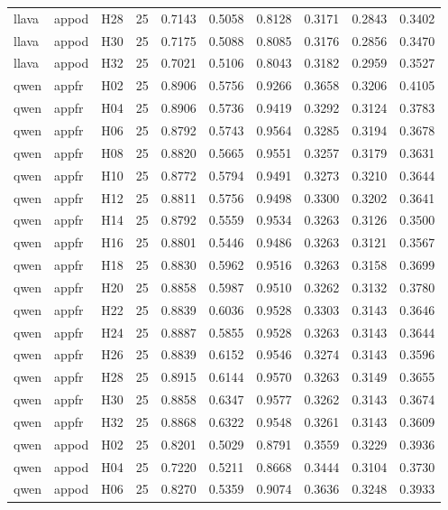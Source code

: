 \begin{table}[tbp]
\begin{tabular}{lllrrrrrrr}
llava & appod & H28 & 25 & 0.7143 & 0.5058 & 0.8128 & 0.3171 & 0.2843 & 0.3402 \\
llava & appod & H30 & 25 & 0.7175 & 0.5088 & 0.8085 & 0.3176 & 0.2856 & 0.3470 \\
llava & appod & H32 & 25 & 0.7021 & 0.5106 & 0.8043 & 0.3182 & 0.2959 & 0.3527 \\
qwen & appfr & H02 & 25 & 0.8906 & 0.5756 & 0.9266 & 0.3658 & 0.3206 & 0.4105 \\
qwen & appfr & H04 & 25 & 0.8906 & 0.5736 & 0.9419 & 0.3292 & 0.3124 & 0.3783 \\
qwen & appfr & H06 & 25 & 0.8792 & 0.5743 & 0.9564 & 0.3285 & 0.3194 & 0.3678 \\
qwen & appfr & H08 & 25 & 0.8820 & 0.5665 & 0.9551 & 0.3257 & 0.3179 & 0.3631 \\
qwen & appfr & H10 & 25 & 0.8772 & 0.5794 & 0.9491 & 0.3273 & 0.3210 & 0.3644 \\
qwen & appfr & H12 & 25 & 0.8811 & 0.5756 & 0.9498 & 0.3300 & 0.3202 & 0.3641 \\
qwen & appfr & H14 & 25 & 0.8792 & 0.5559 & 0.9534 & 0.3263 & 0.3126 & 0.3500 \\
qwen & appfr & H16 & 25 & 0.8801 & 0.5446 & 0.9486 & 0.3263 & 0.3121 & 0.3567 \\
qwen & appfr & H18 & 25 & 0.8830 & 0.5962 & 0.9516 & 0.3263 & 0.3158 & 0.3699 \\
qwen & appfr & H20 & 25 & 0.8858 & 0.5987 & 0.9510 & 0.3262 & 0.3132 & 0.3780 \\
qwen & appfr & H22 & 25 & 0.8839 & 0.6036 & 0.9528 & 0.3303 & 0.3143 & 0.3646 \\
qwen & appfr & H24 & 25 & 0.8887 & 0.5855 & 0.9528 & 0.3263 & 0.3143 & 0.3644 \\
qwen & appfr & H26 & 25 & 0.8839 & 0.6152 & 0.9546 & 0.3274 & 0.3143 & 0.3596 \\
qwen & appfr & H28 & 25 & 0.8915 & 0.6144 & 0.9570 & 0.3263 & 0.3149 & 0.3655 \\
qwen & appfr & H30 & 25 & 0.8858 & 0.6347 & 0.9577 & 0.3262 & 0.3143 & 0.3674 \\
qwen & appfr & H32 & 25 & 0.8868 & 0.6322 & 0.9548 & 0.3261 & 0.3143 & 0.3609 \\
qwen & appod & H02 & 25 & 0.8201 & 0.5029 & 0.8791 & 0.3559 & 0.3229 & 0.3936 \\
qwen & appod & H04 & 25 & 0.7220 & 0.5211 & 0.8668 & 0.3444 & 0.3104 & 0.3730 \\
qwen & appod & H06 & 25 & 0.8270 & 0.5359 & 0.9074 & 0.3636 & 0.3248 & 0.3933 \\

\end{tabular}
\end{table}
